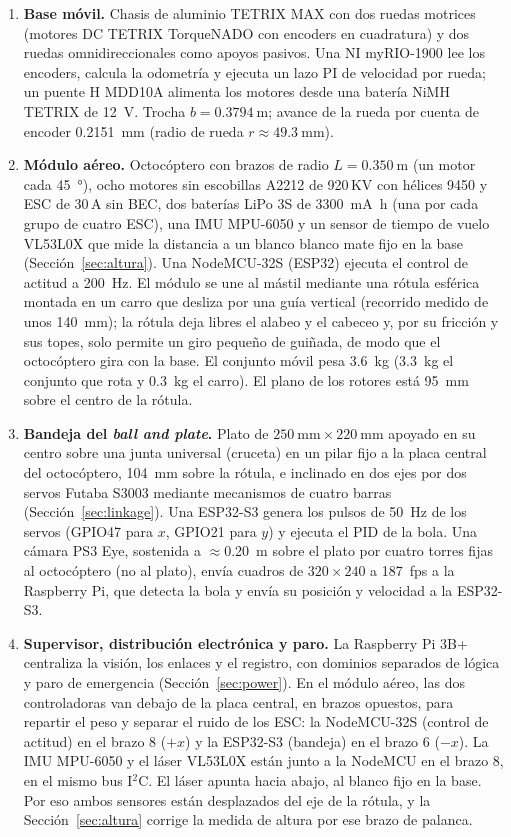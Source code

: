 \begin{enumerate}[label=\textbf{N\arabic*.}]
  \item \textbf{Base móvil.} Chasis de aluminio TETRIX MAX con dos ruedas motrices (motores DC TETRIX TorqueNADO con encoders en cuadratura) y dos ruedas omnidireccionales como apoyos pasivos. Una NI myRIO-1900 lee los encoders, calcula la odometría y ejecuta un lazo PI de velocidad por rueda; un puente H MDD10A alimenta los motores desde una batería NiMH TETRIX de \SI{12}{\volt}. Trocha $b=\SI{0.3794}{\metre}$; avance de la rueda por cuenta de encoder \SI{0.2151}{\milli\metre} (radio de rueda $r\approx\SI{49.3}{\milli\metre}$).
  \item \textbf{Módulo aéreo.} Octocóptero con brazos de radio $L=\SI{0.350}{\metre}$ (un motor cada \SI{45}{\degree}), ocho motores sin escobillas A2212 de 920\,KV con hélices 9450 y ESC de 30\,A sin BEC, dos baterías LiPo 3S de \SI{3300}{\milli\ampere\hour} (una por cada grupo de cuatro ESC), una IMU MPU-6050 y un sensor de tiempo de vuelo VL53L0X que mide la distancia a un blanco blanco mate fijo en la base (Sección~\ref{sec:altura}). Una NodeMCU-32S (ESP32) ejecuta el control de actitud a \SI{200}{\hertz}. El módulo se une al mástil mediante una rótula esférica montada en un carro que desliza por una guía vertical (recorrido medido de unos \SI{140}{\milli\metre}); la rótula deja libres el alabeo y el cabeceo y, por su fricción y sus topes, solo permite un giro pequeño de guiñada, de modo que el octocóptero gira con la base. El conjunto móvil pesa \SI{3.6}{\kilo\gram} (\SI{3.3}{\kilo\gram} el conjunto que rota y \SI{0.3}{\kilo\gram} el carro). El plano de los rotores está \SI{95}{\milli\metre} sobre el centro de la rótula.
  \item \textbf{Bandeja del \textit{ball and plate}.} Plato de $\SI{250}{\milli\metre}\times\SI{220}{\milli\metre}$ apoyado en su centro sobre una junta universal (cruceta) en un pilar fijo a la placa central del octocóptero, \SI{104}{\milli\metre} sobre la rótula, e inclinado en dos ejes por dos servos Futaba S3003 mediante mecanismos de cuatro barras (Sección~\ref{sec:linkage}). Una ESP32-S3 genera los pulsos de \SI{50}{\hertz} de los servos (GPIO47 para $x$, GPIO21 para $y$) y ejecuta el PID de la bola. Una cámara PS3 Eye, sostenida a $\approx$\SI{0.20}{\metre} sobre el plato por cuatro torres fijas al octocóptero (no al plato), envía cuadros de $320\times240$ a \SI{187}{fps} a la Raspberry Pi, que detecta la bola y envía su posición y velocidad a la ESP32-S3.
  \item \textbf{Supervisor, distribución electrónica y paro.} La Raspberry Pi 3B+ centraliza la visión, los enlaces y el registro, con dominios separados de lógica y paro de emergencia (Sección~\ref{sec:power}). En el módulo aéreo, las dos controladoras van debajo de la placa central, en brazos opuestos, para repartir el peso y separar el ruido de los ESC: la NodeMCU-32S (control de actitud) en el brazo 8 ($+x$) y la ESP32-S3 (bandeja) en el brazo 6 ($-x$). La IMU MPU-6050 y el láser VL53L0X están junto a la NodeMCU en el brazo 8, en el mismo bus I$^2$C. El láser apunta hacia abajo, al blanco fijo en la base. Por eso ambos sensores están desplazados del eje de la rótula, y la Sección~\ref{sec:altura} corrige la medida de altura por ese brazo de palanca.

\end{enumerate}
